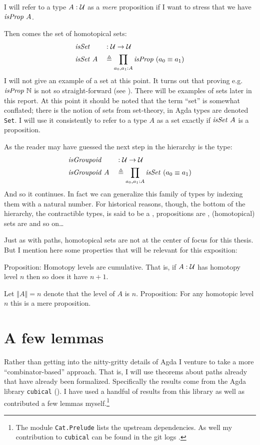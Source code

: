 I will refer to a type $A \mathrel{:} \mathcal{U}$ as a \emph{mere} proposition if I want to
stress that we have $\isProp\ A$.

Then comes the set of homotopical sets:
%
\begin{equation}
\begin{aligned}
& \isSet    && \tp \MCU \to \MCU \\
& \isSet\ A && \defeq \prod_{a_0, a_1 \tp A} \isProp\ (a_0 \equiv a_1)
\end{aligned}
\end{equation}
%
I will not give an example of a set at this point. It turns out that proving
e.g. $\isProp\ \bN$ is not so straight-forward (see \cite[\S3.1.4]{hott-2013}).
There will be examples of sets later in this report. At this point it should be
noted that the term ``set'' is somewhat conflated; there is the notion of sets
from set-theory, in Agda types are denoted \texttt{Set}. I will use it
consistently to refer to a type $A$ as a set exactly if $\isSet\ A$ is a
proposition.

As the reader may have guessed the next step in the hierarchy is the type:
%
\begin{equation}
\begin{aligned}
& \isGroupoid    && \tp \MCU \to \MCU \\
& \isGroupoid\ A && \defeq \prod_{a_0, a_1 \tp A} \isSet\ (a_0 \equiv a_1)
\end{aligned}
\end{equation}
%
And so it continues. In fact we can generalize this family of types by indexing
them with a natural number. For historical reasons, though, the bottom of the
hierarchy, the contractible types, is said to be a , propositions
are , (homotopical) sets are  and so on\ldots

Just as with paths, homotopical sets are not at the center of focus for this
thesis. But I mention here some properties that will be relevant for this
exposition:

Proposition: Homotopy levels are cumulative. That is, if $A \mathrel{:} \mathcal{U}$ has
homotopy level $n$ then so does it have $n + 1$.

Let $\left\Vert A \right\Vert = n$ denote that the level of $A$ is $n$.
Proposition: For any homotopic level $n$ this is a mere proposition.
%
\section{A few lemmas}
Rather than getting into the nitty-gritty details of Agda I venture to take a
more ``combinator-based'' approach. That is, I will use theorems about paths
already that have already been formalized. Specifically the results come from
the Agda library \texttt{cubical} (). I have used a handful of
results from this library as well as contributed a few lemmas myself.\footnote{The module \texttt{Cat.Prelude} lists the upstream dependencies. As well my contribution to \texttt{cubical} can be found in the git logs .}

